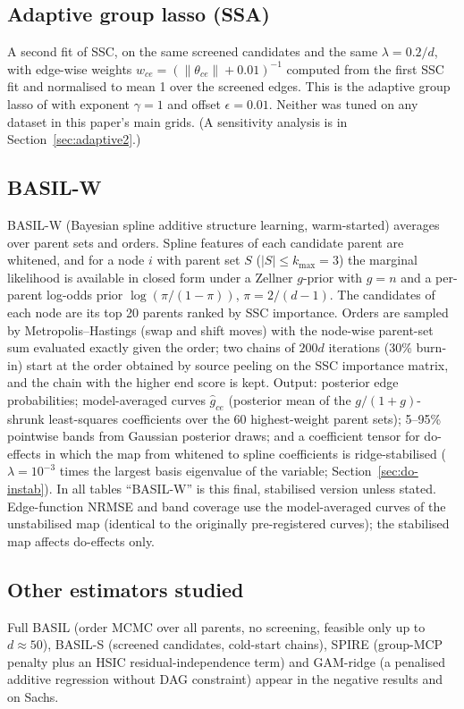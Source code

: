\documentclass[11pt,a4paper]{article}
\begin{document}
\subsection{Adaptive group lasso (SSA)}
A second fit of SSC, on the same screened candidates and the same $\lambda=0.2/d$, with edge-wise weights $w_{ce}=(\lVert\theta_{ce}\rVert+0.01)^{-1}$ computed from the first SSC fit and normalised to mean 1 over the screened edges. This is the adaptive group lasso of \citet{huang2010} with exponent $\gamma=1$ and offset $\epsilon=0.01$. Neither was tuned on any dataset in this paper's main grids. (A sensitivity analysis is in Section~\ref{sec:adaptive2}.)

\subsection{BASIL-W}
BASIL-W (Bayesian spline additive structure learning, warm-started) averages over parent sets and orders. Spline features of each candidate parent are whitened, and for a node $i$ with parent set $S$ ($|S|\le k_{\max}=3$) the marginal likelihood is available in closed form under a Zellner $g$-prior with $g=n$ and a per-parent log-odds prior $\log(\pi/(1-\pi))$, $\pi=2/(d-1)$. The candidates of each node are its top 20 parents ranked by SSC importance. Orders are sampled by Metropolis--Hastings (swap and shift moves) with the node-wise parent-set sum evaluated exactly given the order; two chains of $200d$ iterations (30\% burn-in) start at the order obtained by source peeling on the SSC importance matrix, and the chain with the higher end score is kept. Output: posterior edge probabilities; model-averaged curves $\hat g_{ce}$ (posterior mean of the $g/(1+g)$-shrunk least-squares coefficients over the 60 highest-weight parent sets); 5--95\% pointwise bands from Gaussian posterior draws; and a coefficient tensor for do-effects in which the map from whitened to spline coefficients is ridge-stabilised ($\lambda=10^{-3}$ times the largest basis eigenvalue of the variable; Section~\ref{sec:do-instab}). In all tables ``BASIL-W'' is this final, stabilised version unless stated. Edge-function NRMSE and band coverage use the model-averaged curves of the unstabilised map (identical to the originally pre-registered curves); the stabilised map affects do-effects only.

\subsection{Other estimators studied}
Full BASIL (order MCMC over all parents, no screening, feasible only up to $d\approx 50$), BASIL-S (screened candidates, cold-start chains), SPIRE (group-MCP penalty plus an HSIC residual-independence term) and GAM-ridge (a penalised additive regression without DAG constraint) appear in the negative results and on Sachs.
\end{document}
